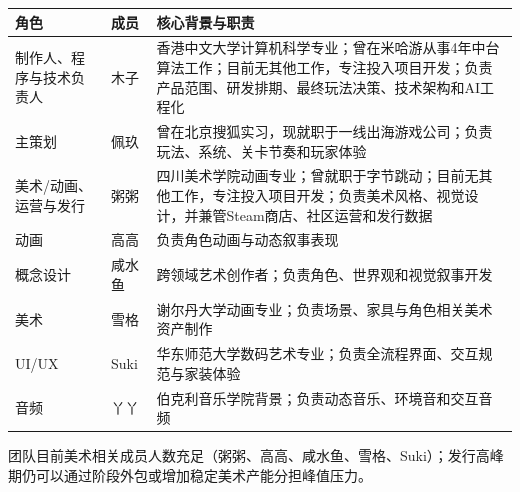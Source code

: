 \documentclass[UTF8,fontset=none,zihao=5,twoside]{ctexart}
\newcounter{none}
\newenvironment{BusinessTable}{%
  \begingroup
  \small
  \setlength{\parindent}{0pt}%
  \setlength{\parskip}{0pt}%
  \rowcolors{2}{TableAlt}{white}%
}{%
  \endgroup
}
\begin{document}
\begin{BusinessTable}

{\def\LTcaptype{none} %
\begin{longtable}[]{@{}
  >{\raggedright\arraybackslash}p{}
  >{\raggedright\arraybackslash}p{}
  >{\raggedright\arraybackslash}p{}@{}}
\toprule\noalign{}
\begin{minipage}[b]{\linewidth}\raggedright
\cellcolor{TableHeader}\color{BrandBlue}\bfseries 角色
\end{minipage} & \begin{minipage}[b]{\linewidth}\raggedright
\cellcolor{TableHeader}\color{BrandBlue}\bfseries 成员
\end{minipage} & \begin{minipage}[b]{\linewidth}\raggedright
\cellcolor{TableHeader}\color{BrandBlue}\bfseries 核心背景与职责
\end{minipage} \\
\midrule\noalign{}
\endhead
\bottomrule\noalign{}
\endlastfoot
制作人、程序与技术负责人 & 木子 & 香港中文大学计算机科学专业；曾在米哈游从事4年中台算法工作；目前无其他工作，专注投入项目开发；负责产品范围、研发排期、最终玩法决策、技术架构和AI工程化 \\
主策划 & 佩玖 & 曾在北京搜狐实习，现就职于一线出海游戏公司；负责玩法、系统、关卡节奏和玩家体验 \\
美术/动画、运营与发行 & 粥粥 & 四川美术学院动画专业；曾就职于字节跳动；目前无其他工作，专注投入项目开发；负责美术风格、视觉设计，并兼管Steam商店、社区运营和发行数据 \\
动画 & 高高 & 负责角色动画与动态叙事表现 \\
概念设计 & 咸水鱼 & 跨领域艺术创作者；负责角色、世界观和视觉叙事开发 \\
美术 & 雪格 & 谢尔丹大学动画专业；负责场景、家具与角色相关美术资产制作 \\
UI/UX & Suki & 华东师范大学数码艺术专业；负责全流程界面、交互规范与家装体验 \\
音频 & 丫丫 & 伯克利音乐学院背景；负责动态音乐、环境音和交互音频 \\
\end{longtable}
}

\end{BusinessTable}

团队目前美术相关成员人数充足（粥粥、高高、咸水鱼、雪格、Suki）；发行高峰期仍可以通过阶段外包或增加稳定美术产能分担峰值压力。
\end{document}
